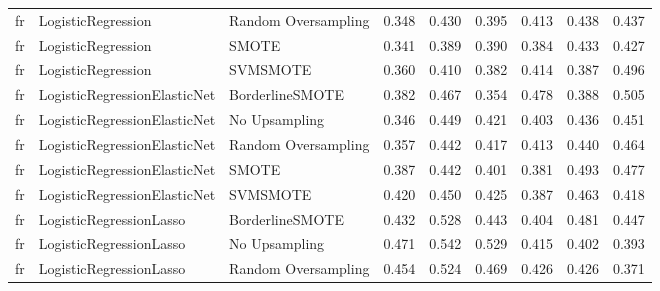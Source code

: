 \begin{tabular}{lllllllll}
      fr &           LogisticRegression & Random Oversampling & 0.348 &                     0.430 &                 0.395 &                  0.413 &                                   0.438 &     0.437 \\
      fr &           LogisticRegression &               SMOTE & 0.341 &                     0.389 &                 0.390 &                  0.384 &                                   0.433 &     0.427 \\
      fr &           LogisticRegression &            SVMSMOTE & 0.360 &                     0.410 &                 0.382 &                  0.414 &                                   0.387 &     0.496 \\
      fr & LogisticRegressionElasticNet &     BorderlineSMOTE & 0.382 &                     0.467 &                 0.354 &                  0.478 &                                   0.388 &     0.505 \\
      fr & LogisticRegressionElasticNet &       No Upsampling & 0.346 &                     0.449 &                 0.421 &                  0.403 &                                   0.436 &     0.451 \\
      fr & LogisticRegressionElasticNet & Random Oversampling & 0.357 &                     0.442 &                 0.417 &                  0.413 &                                   0.440 &     0.464 \\
      fr & LogisticRegressionElasticNet &               SMOTE & 0.387 &                     0.442 &                 0.401 &                  0.381 &                                   0.493 &     0.477 \\
      fr & LogisticRegressionElasticNet &            SVMSMOTE & 0.420 &                     0.450 &                 0.425 &                  0.387 &                                   0.463 &     0.418 \\
      fr &      LogisticRegressionLasso &     BorderlineSMOTE & 0.432 &                     0.528 &                 0.443 &                  0.404 &                                   0.481 &     0.447 \\
      fr &      LogisticRegressionLasso &       No Upsampling & 0.471 &                     0.542 &                 0.529 &                  0.415 &                                   0.402 &     0.393 \\
      fr &      LogisticRegressionLasso & Random Oversampling & 0.454 &                     0.524 &                 0.469 &                  0.426 &                                   0.426 &     0.371 \\

\end{tabular}
